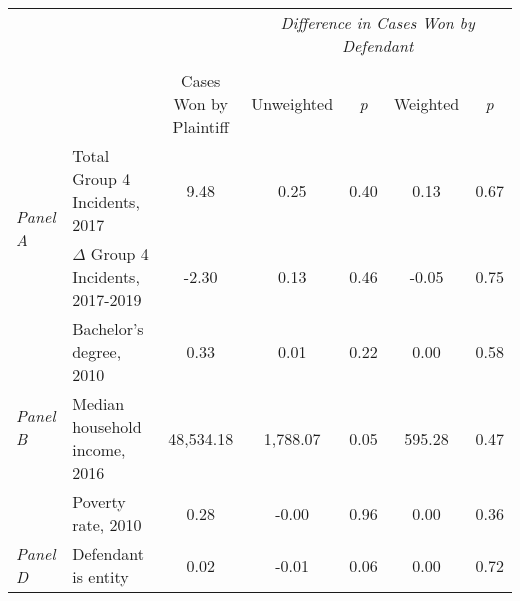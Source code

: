 \begin{tabular}{llccccc}
\toprule
 &  & \textit{} & \multicolumn{4}{c}{\textit{Difference in Cases Won by Defendant}} \\
\cline{4-7}
\\
 &  & Cases Won by Plaintiff & Unweighted & \emph{p} & Weighted & \emph{p} \\
\midrule
\multirow[c]{2}{3cm}{\textit{Panel A}} & Total Group 4 Incidents, 2017 & 9.48 & 0.25 & 0.40 & 0.13 & 0.67 \\
 & $\Delta$ Group 4 Incidents, 2017-2019 & -2.30 & 0.13 & 0.46 & -0.05 & 0.75 \\
\cline{1-7}
\multirow[c]{3}{3cm}{\textit{Panel B}} & Bachelor's degree, 2010 & 0.33 & 0.01 & 0.22 & 0.00 & 0.58 \\
 & Median household income, 2016 & 48,534.18 & 1,788.07 & 0.05 & 595.28 & 0.47 \\
 & Poverty rate, 2010 & 0.28 & -0.00 & 0.96 & 0.00 & 0.36 \\
\cline{1-7}
\textit{Panel D} & Defendant is entity & 0.02 & -0.01 & 0.06 & 0.00 & 0.72 \\
\cline{1-7}
\bottomrule
\end{tabular}
